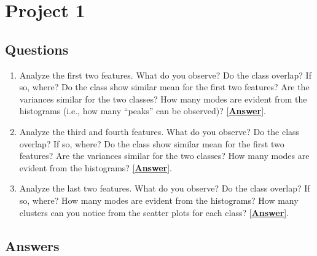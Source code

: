 \documentclass[a4paper, 12pt, english]{article}
\begin{document}
    \newpage


    \section{Project 1}

    \subsection{Questions}
    \begin{enumerate}
        \item Analyze the first two features. What do you observe? Do the class overlap? If so, where? Do the class show similar mean for the first two features? Are the variances similar for the two classes? How many modes are evident from the histograms (i.e., how many “peaks” can be observed)? \hyperref[project1:1]{[\textbf{Answer}]}.
        \item Analyze the third and fourth features. What do you observe? Do the class overlap? If so, where? Do the class show similar mean for the first two features? Are the variances similar for the two classes? How many modes are evident from the histograms? \hyperref[project1:2]{[\textbf{Answer}]}.
        \item Analyze the last two features. What do you observe? Do the class overlap? If so, where? How many modes are evident from the histograms? How many clusters can you notice from the scatter plots for each class? \hyperref[project1:3]{[\textbf{Answer}]}.
    \end{enumerate}

    \subsection{Answers}
\end{document}
